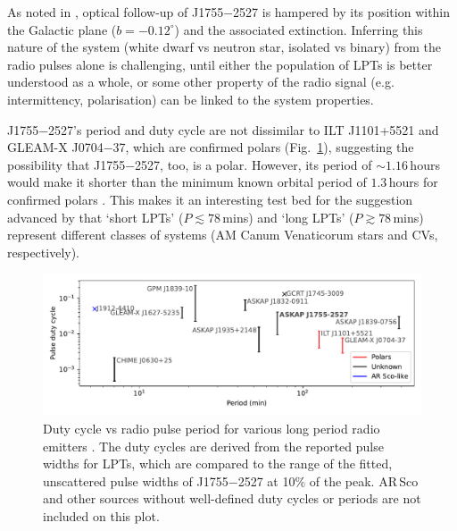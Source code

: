 \documentclass[fleqn,usenatbib]{mnras}
\newcommand{\src}{J1755$-$2527}
\newcommand{\Fig}{Fig.}
\begin{document}
As noted in , optical follow-up of \src{} is hampered by its position within the Galactic plane ($b = -0.12^\circ$) and the associated extinction.
Inferring this nature of the system (white dwarf vs neutron star, isolated vs binary) from the radio pulses alone is challenging, until either the population of LPTs is better understood as a whole, or some other property of the radio signal (e.g. intermittency, polarisation) can be linked to the system properties.

\src{}'s period and duty cycle are not dissimilar to ILT J1101+5521 and GLEAM-X J0704$-$37, which are confirmed polars (\Fig~\ref{fig:lpt_comparison}), suggesting the possibility that \src{}, too, is a polar.
However, its period of ${\sim}1.16\,$hours would make it shorter than the minimum known orbital period of $1.3\,$hours for confirmed polars \citep{schwope2025polarcatcatalogpolarslowaccretion}.
This makes it an interesting test bed for the suggestion advanced by \citet{2025A&A...695L...8R} that `short LPTs' ($P \lesssim 78\,$mins) and `long LPTs' ($P \gtrsim 78\,$mins) represent different classes of systems (AM Canum Venaticorum stars and CVs, respectively).
\begin{figure}
    \centering
    \includegraphics[width=0.98\linewidth]{lpt_comparison.pdf}
    \caption{Duty cycle vs radio pulse period for various long period radio emitters \citep{deRuiter2025,2022Natur.601..526H,2023Natur.619..487H,2024NatAs...8.1159C,2005Natur.434...50H,deRuiter2025,Lee2025,2024arXiv241116606W}. The duty cycles are derived from the reported pulse widths for LPTs, which are compared to the range of the fitted, unscattered pulse widths of \src{} at 10\% of the peak. AR\,Sco \citep{2016Natur.537..374M,2018A&A...611A..66S} and other sources without well-defined duty cycles or periods \citep[e.g.][and references therein]{2021ApJ...920...45W} are not included on this plot.}
    \label{fig:lpt_comparison}
\end{figure}
\end{document}
